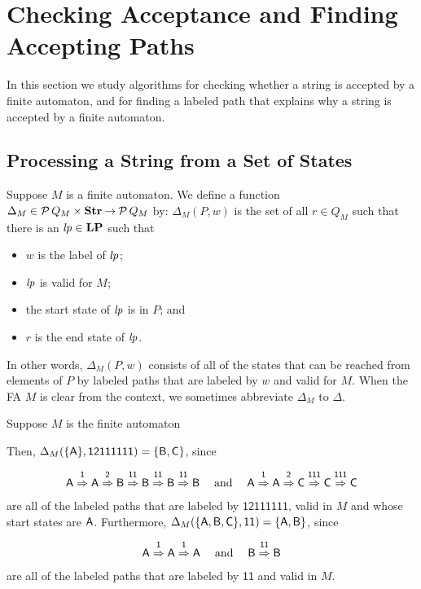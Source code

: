 \section{Checking Acceptance and Finding Accepting Paths}
\label{CheckingAcceptanceAndFindingAcceptingPaths}

In this section we study algorithms for checking whether a string is
%
%
accepted by a finite automaton, and for finding a labeled path that
explains why a string is accepted by a finite automaton.

\subsection{Processing a String from a Set of States}

Suppose $M$ is a finite automaton.  We define a function
$\Delta_M\in{\cal P} \,Q_M\times\mathbf{Str}\mathbin{\to}{\cal P} \,Q_M$ by:
%
%
$\Delta_M(P,w)$ is the set of all $r\in Q_M$ such that there is
an ${\it lp}\in\mathbf{LP}$ such that
\begin{itemize}
\item $w$ is the label of ${\it lp}$;

\item ${\it lp}$ is valid for $M$;

\item the start state of ${\it lp}$ is in $P$; and

\item $r$ is the end state of ${\it lp}$.
\end{itemize}
In other words, $\Delta_M(P,w)$ consists of all of the states that can
be reached from elements of $P$ by labeled paths that are labeled by
$w$ and valid for $M$.  When the FA $M$ is clear from the context, we
sometimes abbreviate $\Delta_M$ to $\Delta$.

Suppose $M$ is the finite automaton
\begin{center}

\end{center}
Then, $\Delta_M(\{\mathsf{A}\},\mathsf{12111111}) =
\{\mathsf{B},\mathsf{C}\}$, since
\begin{gather*}
\mathsf{A\stackrel{\strut1}{\Rightarrow}A\stackrel{\strut2}{\Rightarrow}B\stackrel{\strut11}{\Rightarrow}B\stackrel{\strut11}{\Rightarrow}B\stackrel{\strut11}{\Rightarrow}B}
\quad\;\allowbreak\mbox{and}\allowbreak\;\quad
\mathsf{A\stackrel{\strut1}{\Rightarrow}A\stackrel{\strut2}{\Rightarrow}C\stackrel{\strut111}{\Rightarrow}C\stackrel{\strut111}{\Rightarrow}C}
\end{gather*}
are all of the labeled paths that are labeled by $\mathsf{12111111}$,
valid in $M$ and whose start states are $\mathsf{A}$.
Furthermore, $\Delta_M(\{\mathsf{A},\mathsf{B},\mathsf{C}\},\mathsf{11}) =
\{\mathsf{A},\mathsf{B}\}$, since
\begin{gather*}
\mathsf{A\stackrel{\strut1}{\Rightarrow}A\stackrel{\strut1}{\Rightarrow}A}
\quad\;\allowbreak\mbox{and}\allowbreak\;\quad
\mathsf{B\stackrel{\strut11}{\Rightarrow}B}
\end{gather*}
are all of the labeled paths that are labeled by $\mathsf{11}$ and
valid in $M$.

